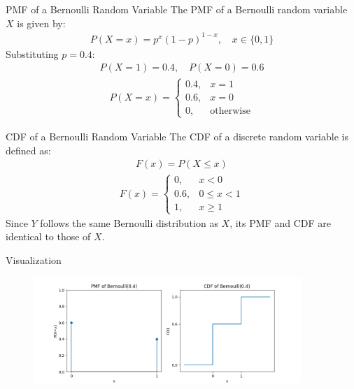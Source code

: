 \documentclass{beamer}
\begin{document}
\begin{frame}{PMF of a Bernoulli Random Variable}
    The PMF of a Bernoulli random variable $X$ is given by:
    \begin{align}
        P(X = x) = p^x (1 - p)^{1 - x}, \quad x \in \{0,1\}
    \end{align}
    Substituting $p = 0.4$:
    \begin{align}
        P(X = 1) = 0.4, \quad P(X = 0) = 0.6
    \end{align}
    \begin{align}
        P(X = x) = \begin{cases}
            0.4, & x = 1 \\
            0.6, & x = 0 \\
            0, & \text{otherwise}
        \end{cases}
    \end{align}
\end{frame}

\begin{frame}{CDF of a Bernoulli Random Variable}
    The CDF of a discrete random variable is defined as:
    \begin{align}
        F(x) = P(X \leq x)
    \end{align}
    \begin{align}
        F(x) = \begin{cases}
            0, & x < 0 \\
            0.6, & 0 \leq x < 1 \\
            1, & x \geq 1
        \end{cases}
    \end{align}
    Since $Y$ follows the same Bernoulli distribution as $X$, its PMF and CDF are identical to those of $X$.
\end{frame}

\begin{frame}{Visualization}
    \begin{figure}
        \centering
        \includegraphics[width=0.9\textwidth]{figs/fig.png}
    \end{figure}
\end{frame}
\end{document}
